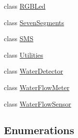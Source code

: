 \begin{DoxyCompactItemize}
class \hyperlink{class_easyuino_1_1_r_g_b_led}{R\+G\+B\+Led}
\item 
class \hyperlink{class_easyuino_1_1_seven_segments}{Seven\+Segments}
\item 
class \hyperlink{class_easyuino_1_1_s_m_s}{S\+MS}
\item 
class \hyperlink{class_easyuino_1_1_utilities}{Utilities}
\item 
class \hyperlink{class_easyuino_1_1_water_detector}{Water\+Detector}
\item 
class \hyperlink{class_easyuino_1_1_water_flow_meter}{Water\+Flow\+Meter}
\item 
class \hyperlink{class_easyuino_1_1_water_flow_sensor}{Water\+Flow\+Sensor}
\end{DoxyCompactItemize}
\subsection*{Enumerations}
